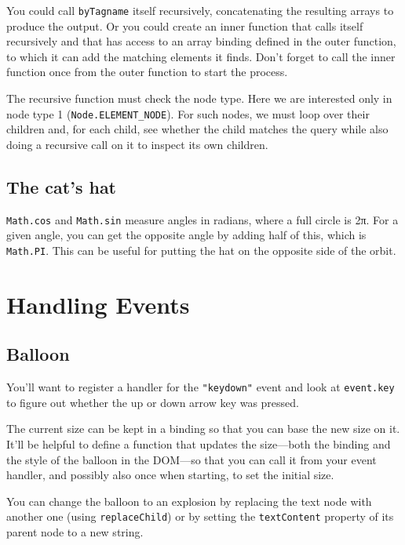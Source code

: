 You could call \lstinline`byTagname` itself recursively, concatenating the resulting arrays to produce the output. Or you could create an inner function that calls itself recursively and that has access to an array binding defined in the outer function, to which it can add the matching elements it finds. Don't forget to call the inner
function once from the outer function to start the process.

The recursive function must check the node type. Here we are interested only in node type 1 (\lstinline`Node.ELEMENT_NODE`). For such nodes, we must loop over their children and, for each child, see whether the child matches the query while also doing a recursive call on it to inspect its own children.

\subsection{The cat's hat}

\lstinline`Math.cos` and \lstinline`Math.sin` measure angles in radians, where a full circle is 2π. For a given angle, you can get the opposite angle by adding half of this, which is \lstinline`Math.PI`. This can be useful for putting the hat on the opposite side of the orbit.

\section{Handling Events}

\subsection{Balloon}

You'll want to register a handler for the \lstinline`"keydown"` event and look at \lstinline`event.key` to figure out whether the up or down arrow key was pressed.

The current size can be kept in a binding so that you can base the new size on it. It'll be helpful to define a function that updates the size—both the binding and the style of the balloon in the DOM—so that you can call it from your event handler, and possibly also once when starting, to set the initial size.

You can change the balloon to an explosion by replacing the text node with another one (using \lstinline`replaceChild`) or by setting the \lstinline`textContent` property of its parent node to a new string.

